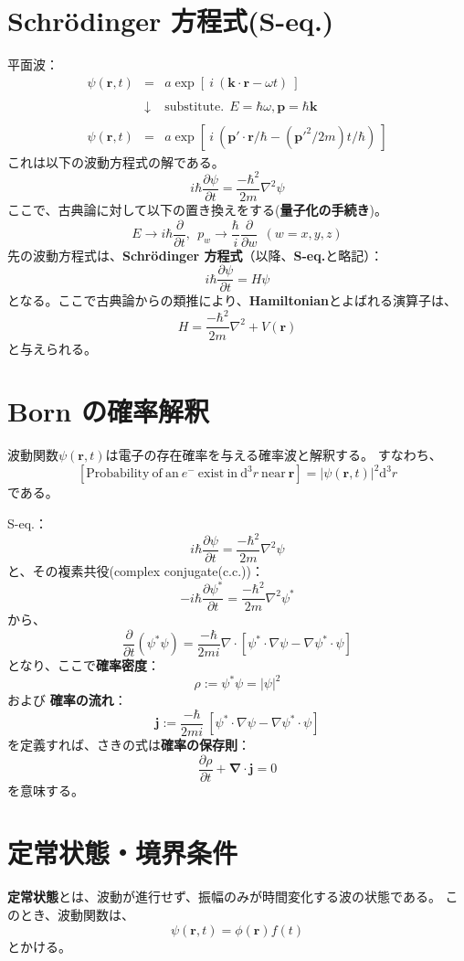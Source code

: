 \documentclass[a4j,10pt,oneside,openany]{jsbook}
\newcommand{\innerprod}[2]{\bm{#1} \cdot \bm{#2}}
\newcommand{\partialder}[2]{\frac{\partial #1}{\partial #2}}
\begin{document}
\section{Schr\"odinger 方程式(S-eq.)}
平面波：
\begin{eqnarray*}
	\psi(\bm{r},t) &=& a \exp [\ i\ (\innerprod{k}{r} - \omega t)\ ] \\ \\
	&\downarrow & \mathrm{substitute.}\ \  E=\hbar \omega, \bm{p}=\hbar\bm{k} \\ \\
	\psi(\bm{r},t) &=& a \exp [\ i\ \left( \innerprod{p'}{r}/\hbar - (\bm{p'}^2/2m) t/\hbar \right) \ ]
\end{eqnarray*}
これは以下の波動方程式の解である。
\[
	i\hbar \partialder{\psi}{t} = \frac{-\hbar^2}{2m} \nabla^2 \psi
\]
ここで、古典論に対して以下の置き換えをする(\textbf{量子化の手続き})。
\[
	E \rightarrow i\hbar \partialder{}{t}, \ \ p_w \rightarrow \frac{\hbar}{i} \partialder{}{w}\ \ (w = x, y, z)
\]
先の波動方程式は、\textbf{Schr\"odinger 方程式}（以降、\textbf{S-eq.}と略記）： 
\[
	i\hbar \partialder{\psi}{t} = H\psi
\]
となる。ここで古典論からの類推により、\textbf{Hamiltonian}とよばれる演算子は、
\[
	H = \frac{-\hbar^2}{2m} \nabla^2 +V(\bm{r})
\]
と与えられる。

\section{Born の確率解釈}
波動関数$\psi(\bm{r},t)$は電子の存在確率を与える確率波と解釈する。
すなわち、
\[
	[
	\mathrm{Probability\ of\ an\ }e^-\ \mathrm{exist\ in\ }\mathrm{d}^3 r\ \mathrm{near\ } \bm{r}]
	= |\psi(\bm{r},t)|^2 \mathrm{d}^3 r
\]
である。

S-eq.：
\[
	i\hbar \partialder{\psi}{t} = \frac{-\hbar^2}{2m} \nabla^2 \psi
\]
と、その複素共役(complex conjugate(c.c.))：
\[
	-i\hbar \partialder{\psi^\ast}{t} = \frac{-\hbar^2}{2m} \nabla^2 \psi^\ast
\]
から、
\[
	\partialder{}{t} \left( \psi^\ast \psi \right)
	= \frac{-\hbar}{2mi} \nabla \cdot \left[ \psi^\ast \cdot \nabla\psi - \nabla\psi^\ast \cdot \psi \right]
\]
となり、ここで\textbf{確率密度}：
\[
	\rho :=  \psi^\ast \psi = | \psi |^2
\]
および \textbf{確率の流れ}：
\[\bm{j} := \frac{-\hbar}{2mi}\ \left[ \psi^\ast \cdot \nabla\psi - \nabla\psi^\ast \cdot \psi \right]\]
を定義すれば、さきの式は\textbf{確率の保存則}：
\[\partialder{\rho}{t} + \innerprod{\nabla}{j} = 0\]
を意味する。

\section{定常状態・境界条件}
\textbf{定常状態}とは、波動が進行せず、振幅のみが時間変化する波の状態である。
このとき、波動関数は、
\[ \psi(\bm{r}, t) = \phi(\bm{r}) f(t) \]
とかける。
\end{document}
